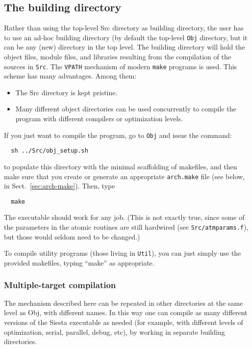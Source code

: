 \documentclass[11pt]{article}
\begin{document}
\subsection{The building directory}

Rather than using the top-level Src directory as building directory,
the user has to use an ad-hoc building directory (by default the
top-level {\tt Obj} directory, but it can be any (new) directory in
the top level.  The building directory will hold the object files,
module files, and libraries resulting from the compilation of the
sources in {\tt Src}.  The {\tt VPATH} mechanism of modern {\tt make}
programs is used. This scheme has many advantages. Among them:

\begin{itemize}
\item The Src directory is kept pristine.
\item Many different object directories can be used concurrently to
  compile the program with different compilers or optimization levels.
\end{itemize}

If you just want to compile the program, go to {\tt Obj} and issue the
command:

\begin{verbatim}
  sh ../Src/obj_setup.sh
\end{verbatim}

to populate this directory with the minimal scaffolding of makefiles,
and then make sure that you create or generate an appropriate {\tt arch.make}
file (see below, in Sect.~\ref{sec:arch-make}). Then, type

\begin{verbatim}
  make
\end{verbatim}

The executable should work for any job. (This is not exactly true,
since some of the parameters in the atomic routines are still
hardwired (see {\tt Src/atmparams.f}), but those would seldom need to
be changed.)

To compile utility programs (those living in {\tt Util}), you can just
simply use the provided makefiles, typing ``make'' as appropriate.

\subsubsection{Multiple-target compilation}

The mechanism described here can be repeated in other directories at
the same level as Obj, with different names. In this way one can
compile as many different versions of the {\sc Siesta} executable as
needed (for example, with different levels of optimization, serial,
parallel, debug, etc), by working in separate building directories.
\end{document}
